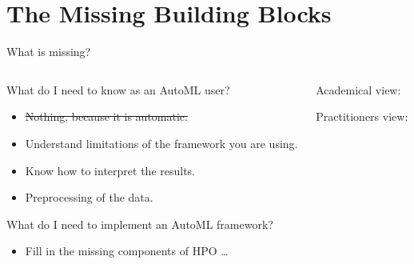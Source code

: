 \section{The Missing Building Blocks}

\begin{frame}{What is missing?}
  \begin{columns}
    \begin{column}{0.5\textwidth}
        What do I need to know as an AutoML user?
        \begin{itemize}
          \item \sout{Nothing, because it is automatic.}
          \item Understand limitations of the framework you are using.
          \item Know how to interpret the results.
          \item Preprocessing of the data.
        \end{itemize}

        \vspace{1em}

        What do I need to implement an AutoML framework?
        \begin{itemize}
          \item Fill in the missing components of HPO \ldots
        \end{itemize}
    \end{column}%
    \begin{column}{0.5\textwidth}
      \begin{center}
        Academical view:
        \scalebox{0.45}{
          
        }

        \vspace{1em}

        Practitioners view:
        \scalebox{0.45}{
          
        }
      \end{center}
    \end{column}
  \end{columns}
\end{frame}

